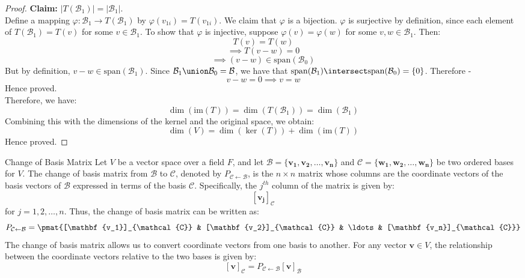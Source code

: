 \documentclass[openany]{book}
\begin{document}
\begin{proof}
    \textbf{Claim: } $|T(\mathcal{B}_1)| = |\mathcal{B}_1|$. \\
    Define a mapping $\varphi: \mathcal{B}_1 \to T(\mathcal{B}_1)$ by $\varphi(v_{1i}) = T(v_{1i})$. We claim that $\varphi$ is a bijection.
    $\varphi$ is surjective by definition, since each element of $T(\mathcal{B}_1) = T(v)$ for some $v \in \mathcal{B}_1$.
    To show that $\varphi$ is injective, suppose $\varphi(v) = \varphi(w)$ for some $v, w \in \mathcal{B}_1$. Then:
    $$T(v) = T(w)$$
    $$\implies T(v - w) = 0$$
    $$\implies (v - w) \in \text{span}(\mathcal{B}_0)$$
    But by definition, $v-w \in \text{span}(\mathcal{B}_1)$. Since $\mathcal{B}_1 \union \mathcal{B}_0 = \mathcal{B}$, we have that $\text{span}(\mathcal{B}_1) \intersect \text{span}(\mathcal{B}_0) = \{0\}$. Therefore - 
    $$v - w = 0 \implies v = w$$
    Hence proved. \\
    Therefore, we have:
    $$\dim(\text{im}(T)) = \dim(T(\mathcal{B}_1)) = \dim(\mathcal{B}_1)$$
    Combining this with the dimensions of the kernel and the original space, we obtain:
    $$\dim(V) = \dim(\ker(T)) + \dim(\text{im}(T))$$
    Hence proved.
\end{proof}
\begin{mydefinition}{Change of Basis Matrix}
    Let $V$ be a vector space over a field $F$, and let $\mathcal{B} = \{\mathbf{v_1}, \mathbf{v_2}, \ldots, \mathbf{v_n}\}$ and $\mathcal{C} = \{\mathbf{w_1}, \mathbf{w_2}, \ldots, \mathbf{w_n}\}$ be two ordered bases for $V$. The change of basis matrix from $\mathcal{B}$ to $\mathcal{C}$, denoted by $P_{\mathcal{C} \leftarrow \mathcal{B}}$, is the $n \times n$ matrix whose columns are the coordinate vectors of the basis vectors of $\mathcal{B}$ expressed in terms of the basis $\mathcal{C}$. Specifically, the $j^{th}$ column of the matrix is given by:
    $$[\mathbf{v_j}]_{\mathcal{C}}$$
    for $j = 1, 2, \ldots, n$. Thus, the change of basis matrix can be written as:
    $$P_{\mathcal{C} \leftarrow \mathcal{B}} = \pmat{[\mathbf{v_1}]_{\mathcal{C}} & [\mathbf{v_2}]_{\mathcal{C}} & \ldots & [\mathbf{v_n}]_{\mathcal{C}}}$$
    The change of basis matrix allows us to convert coordinate vectors from one basis to another. For any vector $\mathbf{v} \in V$, the relationship between the coordinate vectors relative to the two bases is given by:
    $$[\mathbf{v}]_{\mathcal{C}} = P_{\mathcal{C} \leftarrow \mathcal{B}} [\mathbf{v}]_{\mathcal{B}}$$
\end{mydefinition}
\end{document}
